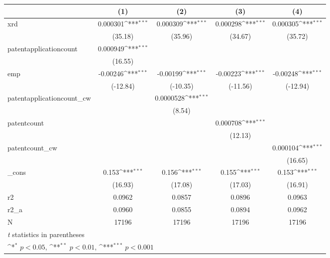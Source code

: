 {
\def\sym#1{\ifmmode^{#1}\else\(^{#1}\)\fi}
\begin{tabular}{l*{4}{c}}
\hline\hline
            &\multicolumn{1}{c}{(1)}         &\multicolumn{1}{c}{(2)}         &\multicolumn{1}{c}{(3)}         &\multicolumn{1}{c}{(4)}         \\
\hline
xrd         &    0.000301\sym{***}&    0.000309\sym{***}&    0.000298\sym{***}&    0.000305\sym{***}\\
            &     (35.18)         &     (35.96)         &     (34.67)         &     (35.72)         \\
[1em]
patentapplicationcount&    0.000949\sym{***}&                     &                     &                     \\
            &     (16.55)         &                     &                     &                     \\
[1em]
emp         &    -0.00246\sym{***}&    -0.00199\sym{***}&    -0.00223\sym{***}&    -0.00248\sym{***}\\
            &    (-12.84)         &    (-10.35)         &    (-11.56)         &    (-12.94)         \\
[1em]
patentapplicationcount\_cw&                     &   0.0000528\sym{***}&                     &                     \\
            &                     &      (8.54)         &                     &                     \\
[1em]
patentcount &                     &                     &    0.000708\sym{***}&                     \\
            &                     &                     &     (12.13)         &                     \\
[1em]
patentcount\_cw&                     &                     &                     &    0.000104\sym{***}\\
            &                     &                     &                     &     (16.65)         \\
[1em]
\_cons      &       0.153\sym{***}&       0.156\sym{***}&       0.155\sym{***}&       0.153\sym{***}\\
            &     (16.93)         &     (17.08)         &     (17.03)         &     (16.91)         \\
\hline
r2          &      0.0962         &      0.0857         &      0.0896         &      0.0963         \\
r2\_a        &      0.0960         &      0.0855         &      0.0894         &      0.0962         \\
N           &       17196         &       17196         &       17196         &       17196         \\
\hline\hline
\multicolumn{5}{l}{\footnotesize \textit{t} statistics in parentheses}\\
\multicolumn{5}{l}{\footnotesize \sym{*} \(p<0.05\), \sym{**} \(p<0.01\), \sym{***} \(p<0.001\)}\\
\end{tabular}
}
